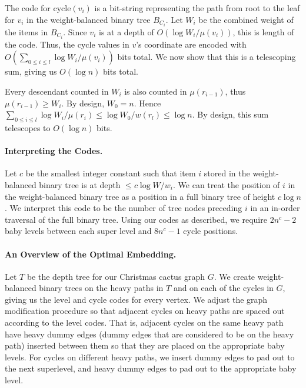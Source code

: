 \documentclass[11pt]{article}
\newcommand{\cycle}{\mathrm{cycle}}
\newcommand{\level}{\mathrm{level}}
\renewcommand{\subsection}[1]{\paragraph{#1.}}
\begin{document}
The code for $\cycle(v_i)$ is a bit-string representing the path from root to the 
leaf for $v_i$ in the weight-balanced binary tree $B_{C_i}$. Let $W_i$ be the
combined weight of the items in $B_{C_i}$. Since $v_i$
is at a depth of $O(\log{W_i/\mu(v_i)})$, this is length of the code.  
Thus, the $\cycle$ values in $v$'s coordinate are encoded
with $O(\sum_{0\leq i \leq l}\log{W_i/\mu(v_i)})$ bits total. 
\ifFull We now show that this is a telescoping sum, giving us $O(\log{n})$ 
bits total.

Every descendant counted in $W_i$ is also counted in $\mu(r_{i-1})$, 
thus $\mu(r_{i-1}) \geq W_i$. By design, $W_0 = n$. Hence 
$\sum_{0\leq i\leq l} \log{W_i/\mu(r_{i})} \leq \log{W_0/w(r_l)} \leq \log{n}$.
\else
By design, this sum telescopes to $O(\log{n})$ bits.
\fi

\subsection{Interpreting the Codes}

Let $c$ be the smallest integer constant such that item $i$ stored 
in the weight-balanced binary
tree is at depth $\leq c\log{W/w_i}$. We can treat the position of $i$ 
in the weight-balanced binary tree as a position in a full binary tree of 
height $c\log{n}$. We interpret this code to be the number of tree nodes 
preceding $i$ in an in-order traversal of the full binary tree. Using our
codes as described, we require $2n^c - 2$ baby levels between each super 
level and $8n^c - 1$ cycle positions.

\subsection{An Overview of the Optimal Embedding}
Let $T$ be the depth tree for our Christmas cactus graph $G$. 
We create weight-balanced binary trees on the heavy paths in $T$ and
on each of the cycles in $G$, giving us the $\level$ and $\cycle$ codes for
every vertex. We adjust the graph modification procedure 
so that adjacent cycles on heavy paths are spaced out according to the
level codes. That is, adjacent cycles on the same heavy path have
heavy dummy edges (dummy edges that are considered to be on 
the heavy path) inserted between them so that they are placed on 
the appropriate baby levels. For cycles on different heavy paths, 
we insert dummy edges to pad out to the next superlevel, 
and heavy dummy edges to pad out to the appropriate baby level. 
\end{document}
